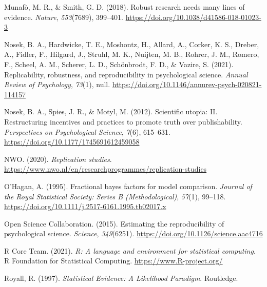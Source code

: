 \documentclass[
]{interact}
\newlength{\cslhangindent}
\newlength{\cslentryspacingunit} %
\newenvironment{CSLReferences}[2] %
    {%
  \setlength{\parindent}{0pt}
  \ifodd #1
  \let\oldpar\par
  \def\par{\hangindent=\cslhangindent\oldpar}
  \fi
  \setlength{\parskip}{#2\cslentryspacingunit}
 }%
 {}
\begin{document}
\begin{CSLReferences}{1}{0}
\leavevmode{}%
Munafò, M. R., \& Smith, G. D. (2018). Robust research needs many lines
of evidence. \emph{Nature}, \emph{553}(7689), 399--401.
\url{https://doi.org/10.1038/d41586-018-01023-3}

\leavevmode{}%
Nosek, B. A., Hardwicke, T. E., Moshontz, H., Allard, A., Corker, K. S.,
Dreber, A., Fidler, F., Hilgard, J., Struhl, M. K., Nuijten, M. B.,
Rohrer, J. M., Romero, F., Scheel, A. M., Scherer, L. D., Schönbrodt, F.
D., \& Vazire, S. (2021). Replicability, robustness, and reproducibility
in psychological science. \emph{Annual Review of Psychology},
\emph{73}(1), null.
\url{https://doi.org/10.1146/annurev-psych-020821-114157}

\leavevmode{}%
Nosek, B. A., Spies, J. R., \& Motyl, M. (2012). Scientific utopia: II.
Restructuring incentives and practices to promote truth over
publishability. \emph{Perspectives on Psychological Science},
\emph{7}(6), 615--631. \url{https://doi.org/10.1177/1745691612459058}

\leavevmode{}%
NWO. (2020). \emph{Replication studies}.
\url{https://www.nwo.nl/en/researchprogrammes/replication-studies}

\leavevmode{}%
O'Hagan, A. (1995). Fractional bayes factors for model comparison.
                    \emph{Journal of the Royal Statistical Society: Series B
                      (Methodological)}, \emph{57}(1), 99--118.
                    \url{https://doi.org/10.1111/j.2517-6161.1995.tb02017.x}
                    
                    \leavevmode{}%
                    Open Science Collaboration. (2015). Estimating the reproducibility of
                    psychological science. \emph{Science}, \emph{349}(6251).
                    \url{https://doi.org/10.1126/science.aac4716}
                    
                    \leavevmode{}%
                    R Core Team. (2021). \emph{R: A language and environment for statistical
                      computing}. R Foundation for Statistical Computing.
                    \url{https://www.R-project.org/}
                    
                    \leavevmode{}%
                    Royall, R. (1997). \emph{{S}tatistical {E}vidence: A {L}ikelihood
                      {P}aradigm}. Routledge.
                    

\end{CSLReferences}
\end{document}
